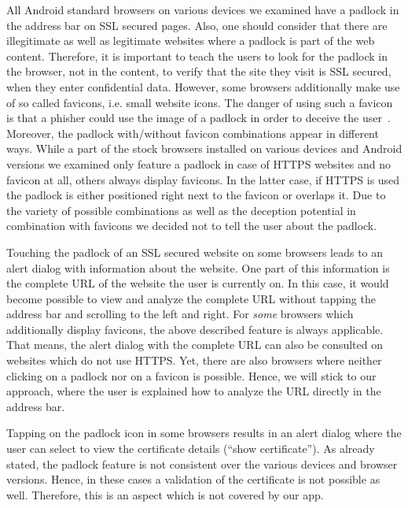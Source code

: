 \begin{description}[leftmargin=0cm]
		\item[HTTPS Padlock] All Android standard browsers on various devices we examined have a padlock in the address bar on SSL secured pages.
Also, one should consider that there are illegitimate as well as legitimate websites where a padlock is part of the web content. 
Therefore, it is important to teach the users to look for the padlock in the browser, not in the content, to verify that the site they visit is SSL secured, when they enter confidential data.
However, some browsers additionally make use of so called favicons, i.e. small website icons.
The danger of using such a favicon is that a phisher could use the image of a padlock in order to deceive the user~\cite{trusteer2011}.
Moreover, the padlock with/without favicon combinations appear in different ways. 
While a part of the stock browsers installed on various devices and Android versions we examined only feature a padlock in case of HTTPS websites and no favicon at all, others always display favicons. 
In the latter case, if HTTPS is used the padlock is either positioned right next to the favicon or overlaps it.
Due to the variety of possible combinations as well as the deception potential in combination with favicons we decided not to tell the user about the padlock.
		\item[Touch Padlock] Touching the padlock of an SSL secured website on some browsers leads to an alert dialog with information about the website. 
One part of this information is the complete URL of the website the user is currently on.
In this case, it would become possible to view and analyze the complete URL without tapping the address bar and scrolling to the left and right.
For \textit{some} browsers which additionally display favicons, the above described feature is always applicable.
That means, the alert dialog with the complete URL can also be consulted on websites which do not use HTTPS.
Yet, there are also browsers where neither clicking on a padlock nor on a favicon is possible.
Hence, we will stick to our approach, where the user is explained how to analyze the URL directly in the address bar.
		\item[Certificate Verification]Tapping on the padlock icon in some browsers results in an alert dialog where the user can select to view the certificate details (``show certificate'').
As already stated, the padlock feature is not consistent over the various devices and browser versions.
Hence, in these cases a validation of the certificate is not possible as well.
Therefore, this is an aspect which is not covered by our app.

\end{description}

